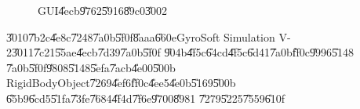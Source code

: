 \bigskip

\begin{figure}[th]
\caption{GUI\U{4ecb}\U{9762}\U{5916}\U{89c0}\U{3002}}
\label{GUI_fig}
\begin{center}
\end{center}
\end{figure}


\bigskip

\U{3010}\U{7b2c}\U{4e8c}\U{7248}\U{7a0b}\U{5f0f}\U{8aaa}\U{660e}GyroSoft
Simulation V-2\U{3011}\U{7c21}\U{55ae}\U{4ecb}\U{7d39}\U{7a0b}\U{5f0f}%
\U{904b}\U{4f5c}\U{64cd}\U{4f5c}\U{6d41}\U{7a0b}\U{ff0c}\U{9996}\U{5148}%
\U{7a0b}\U{5f0f}\U{9808}\U{5148}\U{5efa}\U{7acb}\U{4e00}\U{500b}%
RigidBodyObject\U{7269}\U{4ef6}\U{ff0c}\U{4ee5}\U{4e0b}\U{5169}\U{500b}%
\U{65b9}\U{6cd5}\U{51fa}\U{73fe}\U{7684}\U{4f4d}\U{7f6e}\U{9700}\U{8981}%
\U{7279}\U{5225}\U{7559}\U{610f}

